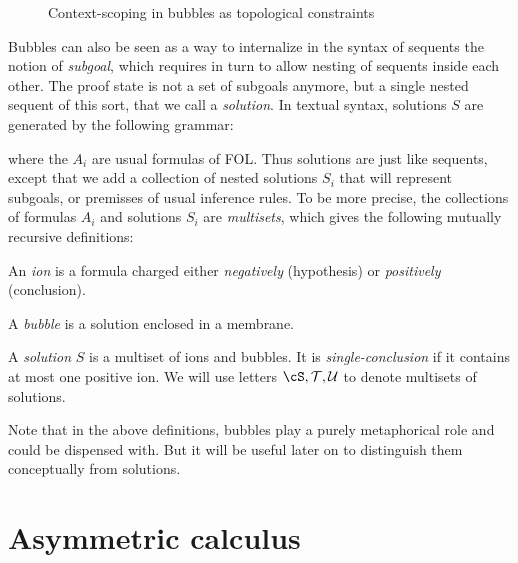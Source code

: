 \begin{figure}
  \caption{Context-scoping in bubbles as topological constraints}
\end{figure}

Bubbles can also be seen as a way to internalize in the syntax of sequents the
notion of \emph{subgoal}, which requires in turn to allow nesting of sequents
inside each other. The proof state is not a set of subgoals anymore, but a
single nested sequent of this sort, that we call a \emph{solution}. In textual syntax, solutions $S$ are generated by the
following grammar:
where the $A_i$ are usual formulas of FOL. Thus solutions are just like
sequents, except that we add a collection of nested solutions $S_i$ that will
represent subgoals, or premisses of usual inference rules. To be more precise,
the collections of formulas $A_i$ and solutions $S_i$ are \emph{multisets},
which gives the following mutually recursive definitions:
\begin{definition}[Ion]
  An \emph{ion} is a formula charged either \emph{negatively} (hypothesis) or
  \emph{positively} (conclusion).
\end{definition}
\begin{definition}[Bubble]
  A \emph{bubble} is a solution enclosed in a membrane.
\end{definition}
\begin{definition}[Solution]
  A \emph{solution} $S$ is a multiset of ions and bubbles. It is
  \emph{single-conclusion} if it contains at most one positive ion. We will use
  letters $\cS, \mathcal{T}, \mathcal{U}$ to denote multisets of
  solutions.
\end{definition}
Note that in the above definitions, bubbles play a purely metaphorical role and
could be dispensed with. But it will be useful later on to distinguish them
conceptually from solutions.

\section{Asymmetric calculus}

